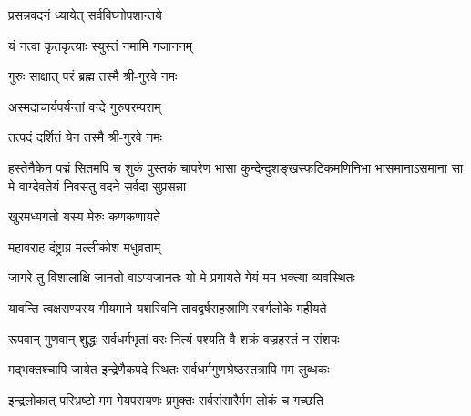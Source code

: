 

{प्रसन्नवदनं ध्यायेत् सर्वविघ्नोपशान्तये}

{यं नत्वा कृतकृत्याः स्युस्तं नमामि गजाननम्}


{गुरुः साक्षात् परं ब्रह्म तस्मै श्री-गुरवे नमः}

{अस्मदाचार्यपर्यन्तां वन्दे गुरुपरम्पराम्}

{तत्पदं दर्शितं येन तस्मै श्री-गुरवे नमः}

{हस्तेनैकेन पद्मं सितमपि च शुकं पुस्तकं चापरेण}
{भासा कुन्देन्दुशङ्खस्फटिकमणिनिभा भासमानाऽसमाना}
{सा मे वाग्देवतेयं निवसतु वदने सर्वदा सुप्रसन्ना}



{खुरमध्यगतो यस्य मेरुः कणकणायते}


{महावराह-दंष्ट्राग्र-मल्लीकोश-मधुव्रताम्}





\twolineshloka
{जागरे तु विशालाक्षि जानतो वाऽप्यजानतः}
{यो मे प्रगायते गेयं मम भक्त्या व्यवस्थितः}%

\twolineshloka
{यावन्ति त्वक्षराण्यस्य गीयमाने यशस्विनि}
{तावद्वर्षसहस्राणि स्वर्गलोके महीयते}%

\twolineshloka
{रूपवान् गुणवान् शुद्धः सर्वधर्मभृतां वरः}
{नित्यं पश्यति वै शक्रं वज्रहस्तं न संशयः}%

\twolineshloka
{मद्भक्तश्चापि जायेत इन्द्रेणैकपदे स्थितः}
{सर्वधर्मगुणश्रेष्ठस्तत्रापि मम लुब्धकः}%

\twolineshloka
{इन्द्रलोकात् परिभ्रष्टो मम गेयपरायणः}
{प्रमुक्तः सर्वसंसारैर्मम लोकं च गच्छति}%

